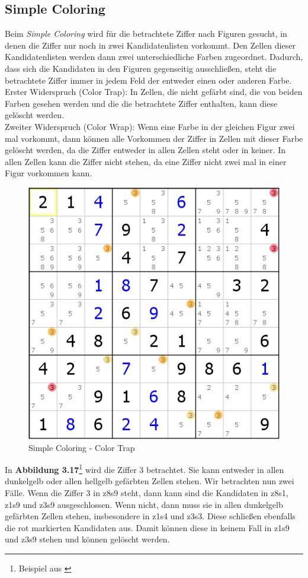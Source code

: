 \newpage
\subsection{Simple Coloring}
\label{Coloring}
Beim \textit{Simple Coloring} wird für die betrachtete Ziffer nach Figuren gesucht, in denen die Ziffer nur noch in zwei Kandidatenlisten vorkommt. Den Zellen dieser Kandidatenlisten werden dann zwei unterschiedliche Farben zugeordnet. Dadurch, dass sich die Kandidaten in den Figuren gegenseitig ausschließen, steht die betrachtete Ziffer immer in jedem Feld der entweder einen oder anderen Farbe.\\ 
Erster Widerspruch (Color Trap): In Zellen, die nicht gefärbt sind, die von beiden Farben gesehen werden und die die betrachtete Ziffer enthalten, kann diese gelöscht werden.\\
Zweiter Widerspruch (Color Wrap): Wenn eine Farbe in der gleichen Figur zwei mal vorkommt, dann können alle Vorkommen der Ziffer in Zellen mit dieser Farbe gelöscht werden, da die Ziffer entweder in allen Zellen steht oder in keiner. In allen Zellen kann die Ziffer nicht stehen, da eine Ziffer nicht zwei mal in einer Figur vorkommen kann.

\begin{figure}[h]
\begin{center}
\includegraphics{./img/simple_coloring.png}
\caption{Simple Coloring - Color Trap}
\end{center}
\end{figure}

In \textbf{Abbildung 3.17}\footnote{Beispiel aus \cite{HDKColoring}} wird die Ziffer 3 betrachtet. Sie kann entweder in allen dunkelgelb oder allen hellgelb gefärbten Zellen stehen. Wir betrachten nun zwei Fälle. Wenn die Ziffer 3 in z8s9 steht, dann kann sind die Kandidaten in z8s1, z1s9 und z3s9 ausgeschlossen. Wenn nicht, dann muss sie in allen dunkelgelb gefärbten Zellen stehen, insbesondere in z1s4 und z3s3. Diese schließen ebenfalls die rot markierten Kandidaten aus. Damit können diese in keinem Fall in z1s9 und z3s9 stehen und können gelöscht werden.